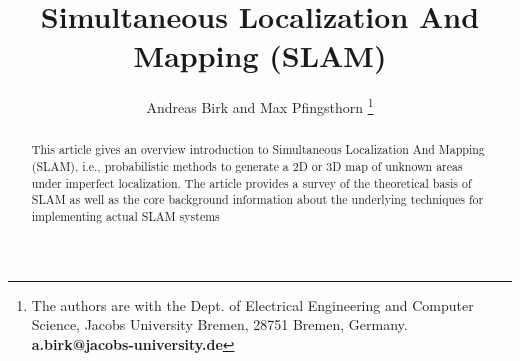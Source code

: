 \documentclass[english]{article}
\begin{document}
\title{Simultaneous Localization And Mapping (SLAM)}

\author{
Andreas Birk and Max Pfingsthorn
\thanks{The authors are with the Dept. of Electrical Engineering and Computer Science, Jacobs University Bremen, 28751 Bremen, Germany.
\textbf{a.birk@jacobs-university.de}}
}

\nocite{*}
\maketitle

\begin{abstract}
    This article gives an overview introduction to Simultaneous Localization And Mapping (SLAM), i.e., probabilistic
    methods to generate a 2D or 3D map of unknown areas under imperfect localization. The article provides a
    survey of the theoretical basis of SLAM as well as the core background information about the underlying techniques
    for implementing actual SLAM systems
\end{abstract}
\end{document}
